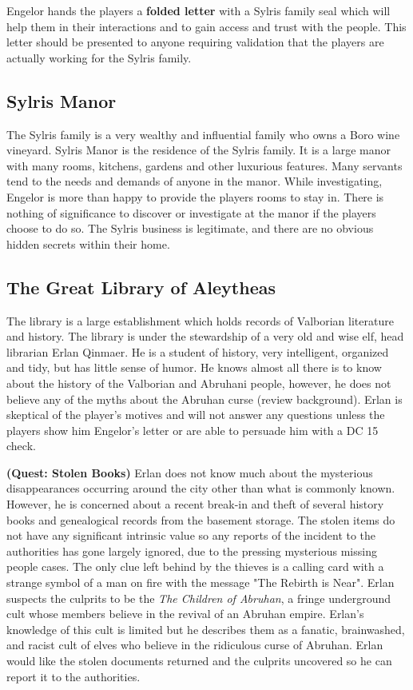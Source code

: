 \begin{multicols*}{2}
Engelor hands the players a \textbf{folded letter} with a Sylris family seal which will help them in their interactions and to gain access and trust with the people. This letter should be presented to anyone requiring validation that the players are actually working for the Sylris family.

\subsection{Sylris Manor}
 The Sylris family is a very wealthy and influential family who owns a Boro wine vineyard. Sylris Manor is the residence of the Sylris family. It is a large manor with many rooms, kitchens, gardens and other luxurious features. Many servants tend to the needs and demands of anyone in the manor. While investigating, Engelor is more than happy to provide the players rooms to stay in. There is nothing of significance to discover or investigate at the manor if the players choose to do so. The Sylris business is legitimate, and there are no obvious hidden secrets within their home.

\subsection{The Great Library of Aleytheas}
The library is a large establishment which holds records of Valborian literature and history. The library is under the stewardship of a very old and wise elf, head librarian Erlan Qinmaer. He is a student of history, very intelligent, organized and tidy, but has little sense of humor. He knows almost all there is to know about the history of the Valborian and Abruhani people, however, he does not believe any of the myths about the Abruhan curse (review background). Erlan is skeptical of the player's motives and will not answer any questions unless the players show him Engelor's letter or are able to persuade him with a DC 15 check.

\textbf{(Quest: Stolen Books)} Erlan does not know much about the mysterious disappearances occurring around the city other than what is commonly known. However, he is concerned about a recent break-in and theft of several history books and genealogical records from the basement storage. The stolen items do not have any significant intrinsic value so any reports of the incident to the authorities has gone largely ignored, due to the pressing mysterious missing people cases. The only clue left behind by the thieves is a calling card with a strange symbol of a man on fire with the message "The Rebirth is Near". Erlan suspects the culprits to be the \emph{The Children of Abruhan}, a fringe underground cult whose members believe in the revival of an Abruhan empire. Erlan's knowledge of this cult is limited but he describes them as a fanatic, brainwashed, and racist cult of elves who believe in the ridiculous curse of Abruhan. Erlan would like the stolen documents returned and the culprits uncovered so he can report it to the authorities.  


\end{multicols*}
